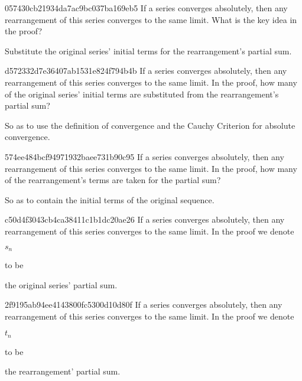 \begin{note}{057430cb21934da7ac9bc037ba169eb5}
    If a series converges absolutely, then any rearrangement of this series converges to the same limit.
    What is the key idea in the proof?

    \begin{cloze}{1}
        Substitute the original series' initial terms for the re\-ar\-range\-ment's partial sum.
    \end{cloze}
\end{note}

\begin{note}{d572332d7e36407ab1531e824f794b4b}
    If a series converges absolutely, then any rearrangement of this series converges to the same limit.
    In the proof, how many of the original series' initial terms are substituted from the rearrangement's partial sum?

    \begin{cloze}{1}
        So as to use the definition of convergence and the Cauchy Criterion for absolute convergence.
    \end{cloze}
\end{note}

\begin{note}{574ee484bcf94971932baee731b90c95}
    If a series converges absolutely, then any rearrangement of this series converges to the same limit.
    In the proof, how many of the rearrangement's terms are taken for the partial sum?

    \begin{cloze}{1}
        So as to contain the initial terms of the original sequence.
    \end{cloze}
\end{note}

\begin{note}{c50d4f3043cb4ca38411c1b1dc20ae26}
    If a series converges absolutely, then any rearrangement of this series converges to the same limit.
    In the proof we denote \begin{icloze}{2}\({ s_n }\)\end{icloze} to be \begin{icloze}{1}the original series' partial sum.\end{icloze}
\end{note}

\begin{note}{2f9195ab94ee4143800fc5300d10d80f}
    If a series converges absolutely, then any rearrangement of this series converges to the same limit.
    In the proof we denote \begin{icloze}{2}\({ t_n }\)\end{icloze} to be \begin{icloze}{1}the rearrangement' partial sum.\end{icloze}
\end{note}

